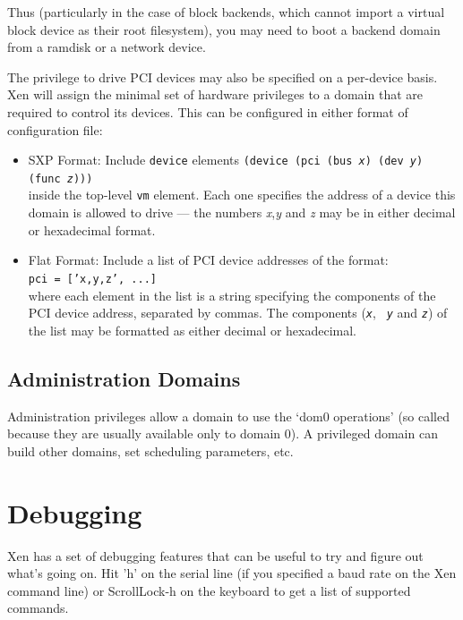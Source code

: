 \documentclass[11pt,twoside,final,openright]{xenstyle}
\begin{document}
{Thus (particularly in the case of block backends, which cannot import
a virtual block device as their root filesystem), you may need to boot
a backend domain from a ramdisk or a network device.

The privilege to drive PCI devices may also be specified on a
per-device basis.  Xen will assign the minimal set of hardware
privileges to a domain that are required to control its devices.  This
can be configured in either format of configuration file:

\begin{itemize}
\item SXP Format:
  Include {\tt device} elements
  {\tt (device (pci (bus {\em x}) (dev {\em y}) (func {\em z}))) } \\
  inside the top-level {\tt vm} element.  Each one specifies the address
  of a device this domain is allowed to drive ---
  the numbers {\em x},{\em y} and {\em z} may be in either decimal or
  hexadecimal format.
\item Flat Format: Include a list of PCI device addresses of the
  format: \\ {\tt pci = ['x,y,z', ...] } \\ where each element in the
  list is a string specifying the components of the PCI device
  address, separated by commas.  The components ({\tt \em x}, {\tt \em
  y} and {\tt \em z}) of the list may be formatted as either decimal
  or hexadecimal.
\end{itemize}

\section{Administration Domains}

Administration privileges allow a domain to use the `dom0
operations' (so called because they are usually available only to
domain 0).  A privileged domain can build other domains, set scheduling
parameters, etc.


\chapter{Debugging}

Xen has a set of debugging features that can be useful to try and
figure out what's going on. Hit 'h' on the serial line (if you
specified a baud rate on the Xen command line) or ScrollLock-h on the
keyboard to get a list of supported commands.

}
\end{document}

